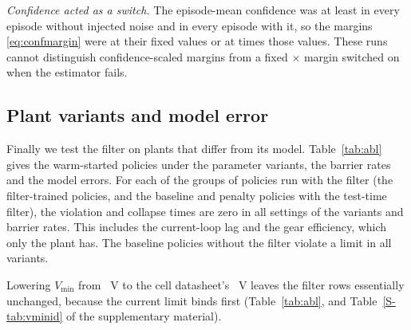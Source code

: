 \emph{Confidence acted as a switch.} The episode-mean confidence was at least  in every episode without injected noise and  in every episode with it, so the margins \eqref{eq:confmargin} were at their fixed values or at  times those values. These runs cannot distinguish confidence-scaled margins from a fixed $\times$ margin switched on when the estimator fails.
\begin{table}[tbp]\centering\caption{Estimated battery parameters: warm-started filter policies with the true-state filter, the EKF with fixed margins and the EKF with confidence-scaled margins, under nominal conditions, the plant's $R_0$ scaled, and mis-specified measurement noise $\sigma$ (true state: on $E$ and $R_0$; EKF: on its two measurements).  seeds $\times$  episodes per state of charge. $t(\Ib>I_{\lim})$: largest over the states of charge of the mean over seeds (no row has time below $V_{\min}$); largest $\Ib$: over all episodes; falls: over seeds and states of charge; max height: mean over seeds; confidence: smallest to largest episode mean; $R_0$ diverged: episodes whose final $R_0$ estimate is outside  to  times the plant's. Per state of charge, with standard deviations and the proof-assumption counters: Table~\ref{S-tab:estfull} of the supplementary material.}\label{tab:est}
\end{table}

\subsection{Plant variants and model error}\label{sec:stress}
Finally we test the filter on plants that differ from its model. Table~\ref{tab:abl} gives the warm-started policies under the parameter variants, the barrier rates and the model errors. For each of the  groups of policies run with the filter (the filter-trained policies, and the baseline and penalty policies with the test-time filter), the violation and collapse times are zero in all  settings of the variants and barrier rates. This includes the current-loop lag and the gear efficiency, which only the plant has. The baseline policies without the filter violate a limit in all  variants.

Lowering $V_{\min}$ from ~V to the cell datasheet's ~V leaves the filter rows essentially unchanged, because the current limit binds first (Table~\ref{tab:abl}, and Table~\ref{S-tab:vminid} of the supplementary material).

